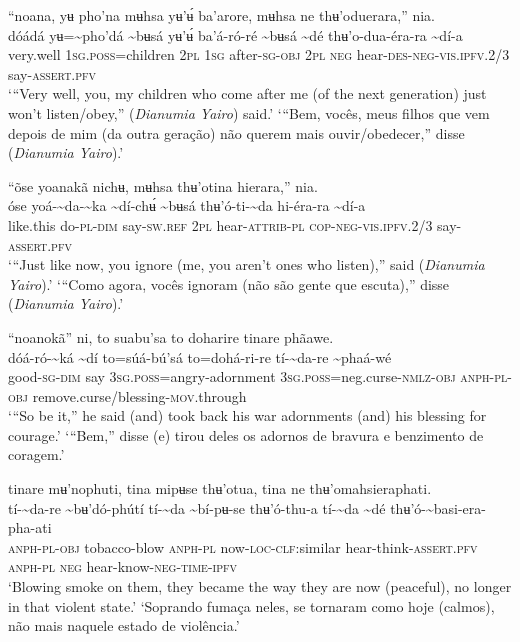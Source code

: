 \documentclass[output=paper,
modfonts,nonflat
]{langsci/langscibook}
\begin{document}
\newpage
\ea “noana, yʉ pho'na mʉhsa yʉ’ʉ́ ba'arore, mʉhsa ne thʉ'oduerara,” nia. \\[.3em]
\gll {\textasciitilde}dóádá	yʉ={\textasciitilde}pho'dá	{\textasciitilde}bʉsá	yʉ’ʉ́	ba'á-ró-ré {\textasciitilde}bʉsá	{\textasciitilde}dé	thʉ'o-dua-éra-ra	{\textasciitilde}dí-a\\
     very.well	1\textsc{sg.poss}=children	2\textsc{pl}	1\textsc{sg}	after\textsc{-sg-obj} 2\textsc{pl}	\textsc{neg}	hear\textsc{-des-neg-vis.ipfv.}2/3	say-\textsc{assert.pfv}\\
\glt ‘“Very well, you, my children who come after me (of the next generation) just won't listen/obey,” (\textit{Dianumia Yairo}) said.’
\glt ‘“Bem, vocês, meus filhos que vem depois de mim (da outra geração) não querem mais ouvir/obedecer,” disse (\textit{Dianumia Yairo}).’
\z 

\ea “õse yoanakã nichʉ, mʉhsa thʉ'otina hierara,” nia.  \\[.3em]
\gll {\textasciitilde}óse	yoá-{\textasciitilde}da-{\textasciitilde}ka	{\textasciitilde}dí-chʉ́	{\textasciitilde}bʉsá	thʉ'ó-ti-{\textasciitilde}da	hi-éra-ra	{\textasciitilde}dí-a \\
     like.this	do\textsc{-pl-dim}	say\textsc{-sw.ref}	2\textsc{pl}	hear\textsc{-attrib-pl}	\textsc{cop-neg-vis.ipfv.}2/3	say-\textsc{assert.pfv}\\
\glt ‘“Just like now, you ignore (me, you aren't ones who listen),” said (\textit{Dianumia Yairo}).’
\glt ‘“Como agora, vocês ignoram (não são gente que escuta),” disse (\textit{Dianumia Yairo}).’
\z 

\ea “noanokã” ni, to suabu'sa to doharire tinare phãawe. \\[.3em]
\gll {\textasciitilde}dóá-ró-{\textasciitilde}ká	{\textasciitilde}dí	to=súá-bú'sá	to=dohá-ri-re	tí-{\textasciitilde}da-re	{\textasciitilde}phaá-wé \\
     good\textsc{-sg-dim}	say	3\textsc{sg.poss}=angry-adornment	3\textsc{sg.poss}=neg.curse\textsc{-nmlz-obj}	\textsc{anph-pl-obj}	remove.curse/blessing-\textsc{mov.}through\\
\glt ‘“So be it,” he said (and) took back his war adornments (and) his blessing for courage.’
\glt ‘“Bem,” disse (e) tirou deles os adornos de bravura e benzimento de coragem.’
\z 

\newpage 
\ea tinare mʉ'nophuti, tina mipʉse thʉ'otua, tina ne thʉ'omahsieraphati. \\[.3em]
\gll tí-{\textasciitilde}da-re	{\textasciitilde}bʉ'dó-phútí	tí-{\textasciitilde}da	{\textasciitilde}bí-pʉ-se	thʉ'ó-thu-a tí-{\textasciitilde}da	{\textasciitilde}dé	thʉ'ó-{\textasciitilde}basi-era-pha-ati{\footnotemark}\\
     \textsc{anph-pl-obj}	tobacco-blow	\textsc{anph-pl}	now\textsc{-loc-clf:}similar	hear-think-\textsc{assert.pfv} \textsc{anph-pl}	\textsc{neg}	hear-know\textsc{-neg-time-ipfv}\\
\glt ‘Blowing smoke on them, they became the way they are now (peaceful), no longer in that violent state.’
\glt ‘Soprando fumaça neles, se tornaram como hoje (calmos), não mais naquele estado de violência.’
\z
\end{document}
